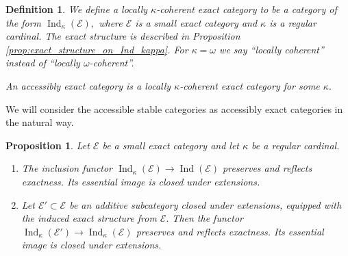 \documentclass[11pt,leqno]{amsart}
\newtheorem{defi}[theo]{Definition}
\newtheorem{prop}[theo]{Proposition}
\numberwithin{equation}{section}
\newcommand{\cE}{{\mathcal E}}
\newcommand{\Ind}{\operatorname{Ind}}
\begin{document}
\begin{defi}
We define a locally $\kappa$-coherent exact category to be a category of the form $\Ind_{\kappa}(\cE),$ where $\cE$ is a small exact category and $\kappa$ is a regular cardinal. The exact structure is described in Proposition \ref{prop:exact_structure_on_Ind_kappa}. For $\kappa=\omega$ we say ``locally coherent'' instead of ``locally $\omega$-coherent''.

An accessibly exact category is a locally $\kappa$-coherent exact category for some $\kappa.$
\end{defi}

We will consider the accessible stable categories as accessibly exact categories in the natural way. 

\begin{prop}\label{prop:properties_of_Ind_kappa_of_small_exact}
Let $\cE$ be a small exact category and let $\kappa$ be a regular cardinal.
\begin{enumerate}[label=(\roman*),ref=(\roman*)]
	\item The inclusion functor $\Ind_{\kappa}(\cE)\to \Ind(\cE)$ preserves and reflects exactness. Its essential image is closed under extensions. \label{Ind_kappa_inside_Ind}
	\item Let $\cE'\subset\cE$ be an additive subcategory closed under extensions, equipped with the induced exact structure from $\cE.$ Then the functor $\Ind_{\kappa}(\cE')\to\Ind_{\kappa}(\cE)$ preserves and reflects exactness. Its essential image is closed under extensions. \label{Ind_kappa_of_subcategory}
\end{enumerate}
\end{prop}
\end{document}
